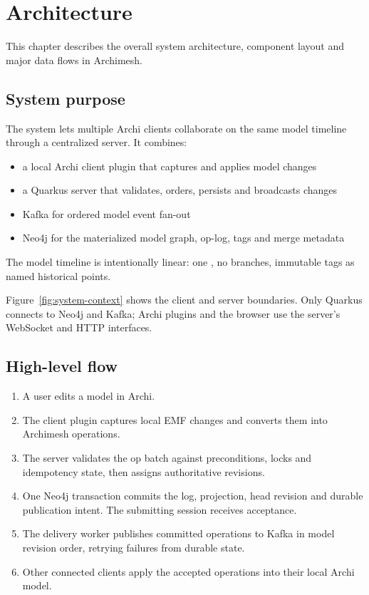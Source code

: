 \section{Architecture}
\label{sec:Architecture}

This chapter describes the overall system architecture, component layout and
major data flows in Archimesh.

\subsection{System purpose}

The system lets multiple Archi clients collaborate on the same model timeline
through a centralized server. It combines:

\begin{itemize}
\item a local Archi client plugin that captures and applies model changes
\item a Quarkus server that validates, orders, persists and broadcasts changes
\item Kafka for ordered model event fan-out
\item Neo4j for the materialized model graph, op-log, tags and merge metadata
\end{itemize}

The model timeline is intentionally linear: one , no branches,
immutable tags as named historical points.

Figure~\ref{fig:system-context} shows the client and server boundaries. Only
Quarkus connects to Neo4j and Kafka; Archi plugins and the browser use the
server's WebSocket and HTTP interfaces.


\subsection{High-level flow}

\begin{enumerate}
\item A user edits a model in Archi.
\item The client plugin captures local EMF changes and converts them into
  Archimesh operations.
\item The server validates the op batch against preconditions, locks and
  idempotency state, then assigns authoritative revisions.
\item One Neo4j transaction commits the log, projection, head revision and
  durable publication intent. The submitting session receives acceptance.
\item The delivery worker publishes committed operations to Kafka in model
  revision order, retrying failures from durable state.
\item Other connected clients apply the accepted operations into their local
  Archi model.
\end{enumerate}

